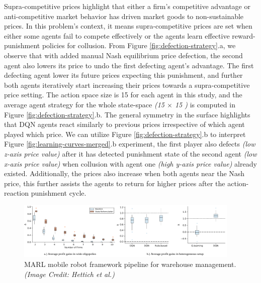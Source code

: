 \documentclass{article}
\begin{document}
Supra-competitive prices highlight that either a firm's competitive advantage or anti-competitive market behavior has driven market goods to non-sustainable prices.
In this problem’s context, it means supra-competitive prices are set when either some agents fail to compete effectively or the agents learn effective reward-punishment policies for collusion.
From Figure \ref{fig:defection-strategy}.a, we observe that with added manual Nash equilibrium price defection, the second agent also lowers its price to undo the first defecting agent’s advantage.
The first defecting agent lower its future prices expecting this punishment, and further both agents iteratively start increasing their prices towards a supra-competitive price setting.
The action space size is 15 for each agent in this study, and the average agent strategy for the whole state-space \textit{(15 $\times$ 15 )} is computed in Figure \ref{fig:defection-strategy}.b.
The general symmetry in the surface highlights that DQN agents react similarly to previous prices irrespective of which agent played which price.
We can utilize Figure \ref{fig:defection-strategy}.b to interpret Figure \ref{fig:learning-curves-merged}.b experiment, the first player also defects \textit{(low z-axis price value)} after it has detected punishment state of the second agent \textit{(low x-axis price value)} when collusion with agent one \textit{(high y-axis price value)} already existed.
Additionally, the prices also increase when both agents near the Nash price, this further assists the agents to return for higher prices after the action-reaction punishment cycle.


\begin{figure}[h]
    \centering
    \includegraphics[width=0.95\textwidth]{study-two/additional-experiments.png}
    \caption{MARL mobile robot framework pipeline for warehouse management. \textit{(Image Credit: Hettich et al.)}}
    \label{fig:additional-experiments}
\end{figure}
\end{document}
